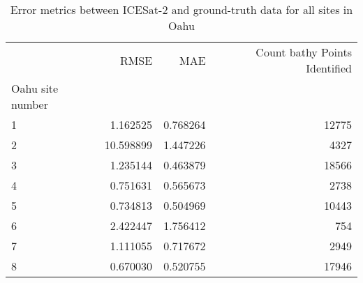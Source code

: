 \begin{table}[h!]
\caption{Error metrics between ICESat-2 and ground-truth data for all sites in Oahu}
\label{tab:Oahusitestats}
\begin{tabular}{lrrr}
\toprule
 & RMSE & MAE & Count bathy Points Identified \\
Oahu site number &  &  &  \\
\midrule
1 & 1.162525 & 0.768264 & 12775 \\
2 & 10.598899 & 1.447226 & 4327 \\
3 & 1.235144 & 0.463879 & 18566 \\
4 & 0.751631 & 0.565673 & 2738 \\
5 & 0.734813 & 0.504969 & 10443 \\
6 & 2.422447 & 1.756412 & 754 \\
7 & 1.111055 & 0.717672 & 2949 \\
8 & 0.670030 & 0.520755 & 17946 \\
\bottomrule
\end{tabular}
\end{table}
